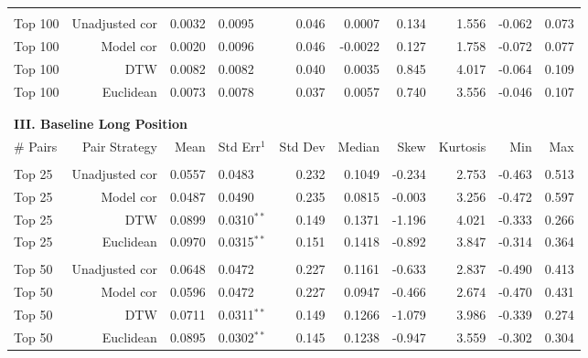\documentclass[12pt]{article}
\begin{document}
\begin{table}[hp]
\begin{tabular}{l r r l r r r r r r}
        \vspace{-1mm} \\
        Top 100   & Unadjusted cor &  0.0032 & 0.0095          & 0.046 &  0.0007 &  0.134 & 1.556 & -0.062 & 0.073 \\
        Top 100   & Model cor      &  0.0020 & 0.0096          & 0.046 & -0.0022 &  0.127 & 1.758 & -0.072 & 0.077 \\
        Top 100   & DTW            &  0.0082 & 0.0082          & 0.040 &  0.0035 &  0.845 & 4.017 & -0.064 & 0.109 \\
        Top 100   & Euclidean      &  0.0073 & 0.0078          & 0.037 &  0.0057 &  0.740 & 3.556 & -0.046 & 0.107 \\
        \vspace{-1mm} \\
        \hline
        \vspace{1 mm} \\
        \multicolumn{9}{l}{\textbf{III. Baseline Long Position}} \\
        \# Pairs & Pair Strategy & Mean & Std Err{$^{1}$} & Std Dev & Median & Skew & Kurtosis & Min & Max \\
        \hline
        \vspace{-1mm} \\
        Top 25    & Unadjusted cor & 0.0557 & 0.0483          & 0.232 & 0.1049 & -0.234 & 2.753 & -0.463 & 0.513 \\
        Top 25    & Model cor      & 0.0487 & 0.0490          & 0.235 & 0.0815 & -0.003 & 3.256 & -0.472 & 0.597 \\
        Top 25    & DTW            & 0.0899 & 0.0310{$^{**}$} & 0.149 & 0.1371 & -1.196 & 4.021 & -0.333 & 0.266 \\
        Top 25    & Euclidean      & 0.0970 & 0.0315{$^{**}$} & 0.151 & 0.1418 & -0.892 & 3.847 & -0.314 & 0.364 \\
        \vspace{-1mm} \\
        Top 50    & Unadjusted cor & 0.0648 & 0.0472          & 0.227 & 0.1161 & -0.633 & 2.837 & -0.490 & 0.413 \\
        Top 50    & Model cor      & 0.0596 & 0.0472          & 0.227 & 0.0947 & -0.466 & 2.674 & -0.470 & 0.431 \\
        Top 50    & DTW            & 0.0711 & 0.0311{$^{**}$} & 0.149 & 0.1266 & -1.079 & 3.986 & -0.339 & 0.274 \\
        Top 50    & Euclidean      & 0.0895 & 0.0302{$^{**}$} & 0.145 & 0.1238 & -0.947 & 3.559 & -0.302 & 0.304 \\

\end{tabular}
\end{table}
\end{document}

